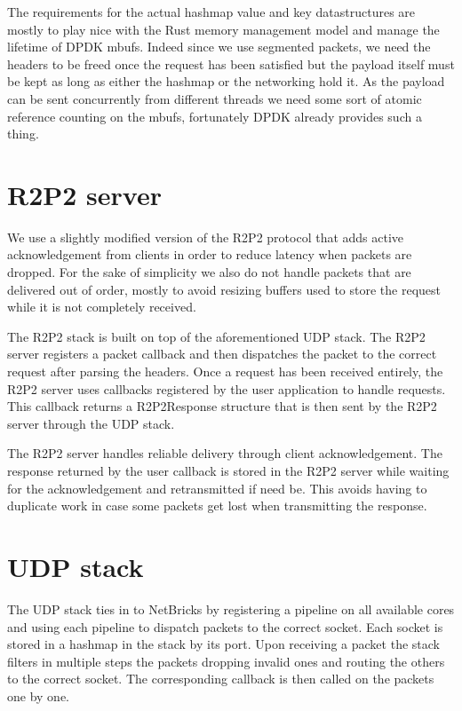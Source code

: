 The requirements for the actual hashmap value and key datastructures
are mostly to play nice with the Rust memory management model and
manage the lifetime of DPDK mbufs. Indeed since we use segmented
packets, we need the headers to be freed once the request has been
satisfied but the payload itself must be kept as long as either the
hashmap or the networking hold it. As the payload can be sent
concurrently from different threads we need some sort of atomic
reference counting on the mbufs, fortunately DPDK already provides
such a thing.

\section{R2P2 server}

We use a slightly modified version of the R2P2 protocol that adds
active acknowledgement from clients in order to reduce latency when
packets are dropped. For the sake of simplicity we also do not handle
packets that are delivered out of order, mostly to avoid resizing
buffers used to store the request while it is not completely
received.

The R2P2 stack is built on top of the aforementioned UDP stack. The
R2P2 server registers a packet callback and then dispatches the packet
to the correct request after parsing the headers. Once a request has
been received entirely, the R2P2 server uses callbacks registered by
the user application to handle requests. This callback returns a
R2P2Response structure that is then sent by the R2P2 server through
the UDP stack.

The R2P2 server handles reliable delivery through client
acknowledgement. The response returned by the user callback is stored
in the R2P2 server while waiting for the acknowledgement and
retransmitted if need be. This avoids having to duplicate work in case
some packets get lost when transmitting the response.

\section{UDP stack}

The UDP stack ties in to NetBricks by registering a pipeline on all
available cores and using each pipeline to dispatch packets to the
correct socket. Each socket is stored in a hashmap in the stack by its
port. Upon receiving a packet the stack filters in multiple steps the
packets dropping invalid ones and routing the others to the correct
socket. The corresponding callback is then called on the packets one
by one.

